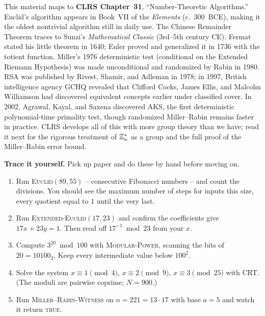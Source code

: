 \begin{historybox}
This material maps to \textbf{CLRS Chapter~31}, ``Number-Theoretic Algorithms.'' Euclid's algorithm appears in Book~VII of the \emph{Elements} (c.~300~BCE), making it the oldest nontrivial algorithm still in daily use. The Chinese Remainder Theorem traces to Sunzi's \emph{Mathematical Classic} (3rd--5th century CE). Fermat stated his little theorem in 1640; Euler proved and generalized it in 1736 with the totient function. Miller's 1976 deterministic test (conditional on the Extended Riemann Hypothesis) was made unconditional and randomized by Rabin in 1980. RSA was published by Rivest, Shamir, and Adleman in 1978; in 1997, British intelligence agency GCHQ revealed that Clifford Cocks, James Ellis, and Malcolm Williamson had discovered equivalent concepts earlier under classified cover. In 2002, Agrawal, Kayal, and Saxena discovered AKS, the first deterministic polynomial-time primality test, though randomized Miller--Rabin remains faster in practice. CLRS develops all of this with more group theory than we have; read it next for the rigorous treatment of $\mathbb{Z}_n^{*}$ as a group and the full proof of the Miller--Rabin error bound.
\end{historybox}

\begin{labbox}
\textbf{Trace it yourself.} Pick up paper and do these by hand before moving on.
\begin{enumerate}
  \item Run \textsc{Euclid}$(89, 55)$ -- consecutive Fibonacci numbers -- and
        count the divisions. You should see the maximum number of steps for
        inputs this size, every quotient equal to $1$ until the very last.
  \item Run \textsc{Extended-Euclid}$(17, 23)$ and confirm the coefficients give
        $17x + 23y = 1$. Then read off $17^{-1} \bmod 23$ from your $x$.
  \item Compute $3^{20} \bmod 100$ with \textsc{Modular-Power}, scanning the
        bits of $20 = 10100_2$. Keep every intermediate value below $100^2$.
  \item Solve the system $x \equiv 1 \pmod 4$, $x \equiv 2 \pmod 9$, $x \equiv 3
        \pmod{25}$ with CRT. (The moduli are pairwise coprime; $N = 900$.)
  \item Run \textsc{Miller--Rabin-Witness} on $n = 221 = 13 \cdot 17$ with base
        $a = 5$ and watch it return \textsc{true}.
\end{enumerate}
\end{labbox}

